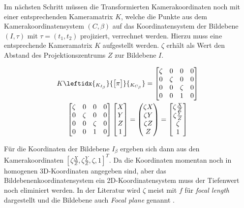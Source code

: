 Im nächsten Schritt müssen die Transformierten Kamerakoordinaten noch mit einer entsprechenden Kameramatrix $K$, welche die Punkte aus dem Kamerakoordinatensystem $(C,\beta)$ auf das Koordinatensystem der Bildebene $(I,\tau)$ mit $\tau = (t_1,t_2)$ projiziert, verrechnet werden. Hierzu muss eine entsprechende Kameramatrix $K$ aufgestellt werden. $\zeta$ erhält als Wert den Abstand des Projektionszentrums $Z$ zur Bildebene $I$.

	\begin{gather}
K
\leftidx{_{K_{I_\beta}}}{\begin{bmatrix}
	\pi
	\end{bmatrix}}{_{K_{C_\beta}}}
=
\begin{bmatrix}
\zeta&0&0&0\\
0&\zeta&0&0\\
0&0&\zeta&0\\
0&0&1&0
\end{bmatrix}\\
\begin{bmatrix}
\zeta&0&0&0\\
0&\zeta&0&0\\
0&0&\zeta&0\\
0&0&1&0
\end{bmatrix}
\begin{bmatrix}
X\\Y\\Z\\1
\end{bmatrix} =
\begin{pmatrix}
\zeta X\\ \zeta Y\\ \zeta Z \\ Z
\end{pmatrix}
=
\begin{bmatrix}
\zeta \frac{X}{Z}\\ \zeta \frac{Y}{Z}\\ \zeta  \\ 1
\end{bmatrix}
\end{gather}

Für die Koordinaten der Bildebene $I_\beta$ ergeben sich dann aus den Kamerakoordinaten $[\zeta \frac{X}{Z},\zeta\frac{Y}{Z},\zeta,1]^T$. Da die Koordinaten momentan noch in homogenen 3D-Koordinaten angegeben sind, aber das Bildebenenkoordinatensystem ein 2D-Koordinatensystem muss der Tiefenwert noch eliminiert werden. In der Literatur  wird $\zeta$ meist mit $f$ für \textit{focal length} dargestellt und die Bildebene auch \textit{Focal plane} genannt \cite{HZ}. 

